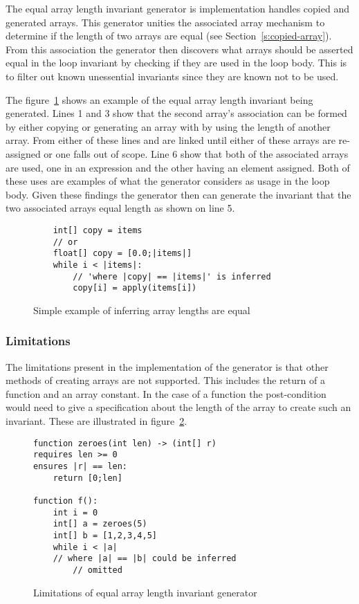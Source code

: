 
The equal array length invariant generator is implementation handles copied and
generated arrays.
This generator unities the associated array mechanism to determine if the
length of two arrays are equal (see Section~\ref{s:copied-array}).
From this association the generator then discovers what arrays should
be asserted equal in the loop invariant by checking if they are used in the
loop body.
This is to filter out known unessential invariants since they are known not to
be used.

The figure~\ref{lst:whiley-length} shows an example of the equal array length
invariant being generated.
Lines 1 and 3 show that the second array's association can be formed by either
copying or generating an array with by using the length of another array.
From either of these lines  and  are linked until
either of these arrays are re-assigned or one falls out of scope.
Line 6 show that both of the associated arrays are used, one in an expression
and the other having an element assigned.
Both of these uses are examples of what the generator considers as usage in
the loop body.
Given these findings the generator then can generate the invariant that
the two associated arrays equal length as shown on line 5.

\begin{figure}
\begin{lstlisting}
    int[] copy = items
    // or
    float[] copy = [0.0;|items|]
    while i < |items|:
        // 'where |copy| == |items|' is inferred
        copy[i] = apply(items[i])
\end{lstlisting}
\caption{Simple example of inferring array lengths are equal}
\label{lst:whiley-length}
\end{figure}

\subsubsection{Limitations}

The limitations present in the implementation of the generator is
that other methods of creating arrays are not supported.
This includes the return of a function and an array constant.
In the case of a function the post-condition would need to
give a specification about the length of the array to create
such an invariant.
These are illustrated in figure~\ref{lst:whiley-length-limit}.

\begin{figure}
\begin{lstlisting}
function zeroes(int len) -> (int[] r)
requires len >= 0
ensures |r| == len:
    return [0;len]

function f():
    int i = 0
    int[] a = zeroes(5)
    int[] b = [1,2,3,4,5]
    while i < |a|
    // where |a| == |b| could be inferred
        // omitted
\end{lstlisting}
\caption{Limitations of equal array length invariant generator}
\label{lst:whiley-length-limit}
\end{figure}

